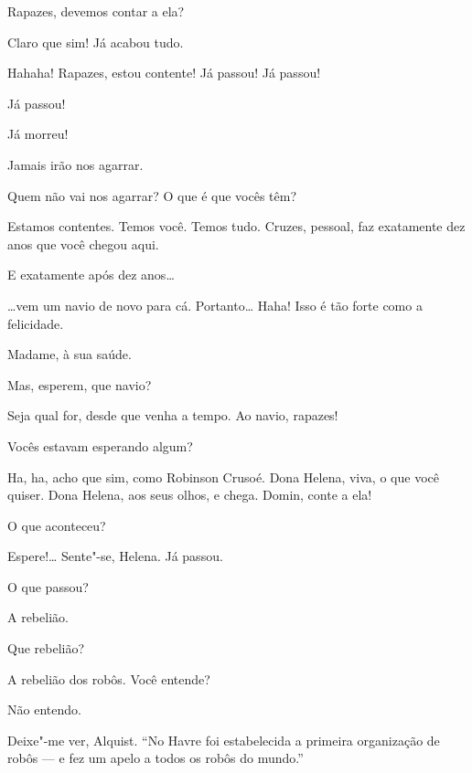  Rapazes, devemos contar a ela?

 Claro que sim! Já acabou tudo.

  Hahaha! Rapazes,
estou contente!  Já passou! Já
passou!

  Já passou!

  Já morreu!

 Jamais irão nos agarrar.

  Quem não vai nos agarrar? 
O que é que vocês têm?

 Estamos contentes. Temos você. Temos tudo. Cruzes, pessoal, faz
exatamente dez anos que você chegou aqui.

 E exatamente após dez anos\ldots{}

 \ldots{}vem um navio de novo para cá. Portanto\ldots{} 
Haha! Isso é tão forte como a felicidade.

 Madame, à sua saúde. 

 Mas, esperem, que navio?

 Seja qual for, desde que venha a tempo. Ao navio, rapazes!

  Vocês estavam esperando algum?

 Ha, ha, acho que sim, como Robinson Crusoé.  Dona
Helena, viva, o que você quiser. Dona Helena, aos seus olhos, e chega. Domin, conte a ela!

  O que aconteceu?

  Espere!\ldots{}
Sente"-se, Helena.  Já passou.

 O que passou?

 A rebelião.

 Que rebelião?

 A rebelião dos robôs. Você entende?

 Não entendo.

 Deixe"-me ver, Alquist.  ``No Havre foi estabelecida a primeira organização de robôs --- e fez um
apelo a todos os robôs do mundo.''

